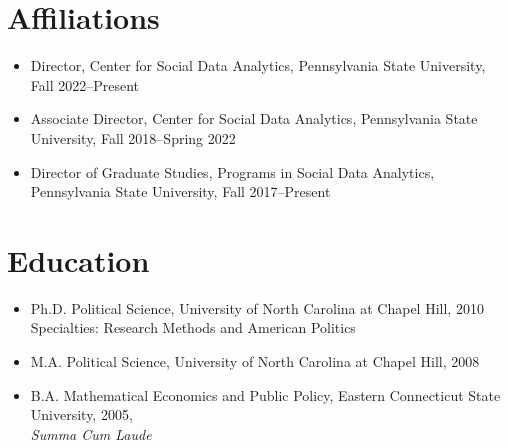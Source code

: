 \documentclass[overlapped,line]{res}
\begin{document}
\begin{resume}
\section{\bf Affiliations}
\begin{itemize}
\item Director, Center for Social Data Analytics, Pennsylvania State University, Fall 2022--Present
\item Associate Director, Center for Social Data Analytics, Pennsylvania State University, Fall 2018--Spring 2022
\item Director of Graduate Studies, Programs in Social Data Analytics, Pennsylvania State University, Fall 2017--Present
\end{itemize}

\section{\bf Education}
\begin{itemize} 
\item Ph.D. Political Science, University of North Carolina at Chapel Hill, 2010\\
Specialties: Research Methods and American Politics
\item M.A. Political Science, University of North Carolina at Chapel Hill, 2008

\item B.A. Mathematical Economics and Public Policy, Eastern Connecticut State University, 2005,
\\ {\it Summa Cum Laude}
\end{itemize}








\end{resume}
\end{document}
